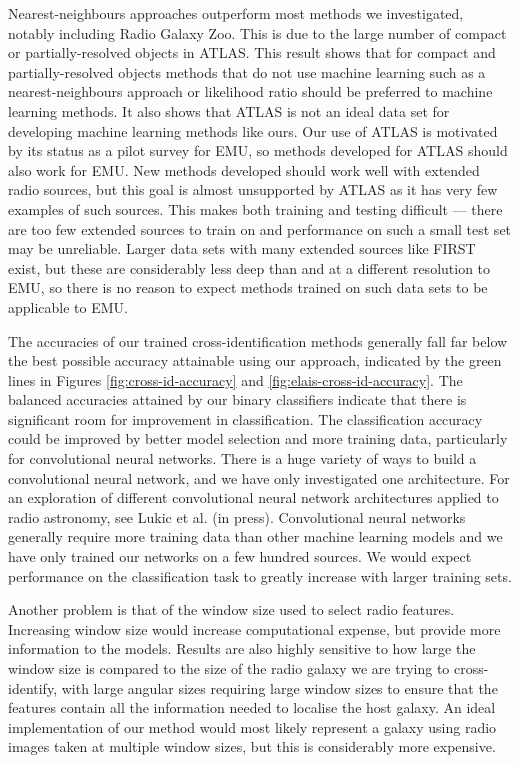 \documentclass[fleqn,usenatbib,usedcolumn]{mnras}
\begin{document}
  Nearest-neighbours approaches outperform most methods we investigated,
  notably including Radio Galaxy Zoo. This is due to the large number of
  compact or partially-resolved objects in ATLAS. This result shows that for
  compact and partially-resolved objects methods that do not use machine
  learning such as a nearest-neighbours approach or likelihood ratio
  \citep{weston18lrpy} should be preferred to machine learning methods. It
  also shows that ATLAS is not an ideal data set for developing machine
  learning methods like ours. Our use of ATLAS is motivated by its status as a
  pilot survey for EMU, so methods developed for ATLAS should also work for
  EMU. New methods developed should work well with extended radio sources, but
  this goal is almost unsupported by ATLAS as it has very few examples of such
  sources. This makes both training and testing difficult --- there are too
  few extended sources to train on and performance on such a small test set
  may be unreliable. Larger data sets with many extended sources like FIRST
  exist, but these are considerably less deep than and at a different
  resolution to EMU, so there is no reason to expect methods trained on such
  data sets to be applicable to EMU.

  The accuracies of our trained cross-identification methods generally fall
  far below the best possible accuracy attainable using our approach,
  indicated by the green lines in Figures \ref{fig:cross-id-accuracy} and
  \ref{fig:elais-cross-id-accuracy}. The balanced accuracies attained by our
  binary classifiers indicate that there is significant room for improvement
  in classification. The classification accuracy could be improved by better
  model selection and more training data, particularly for convolutional
  neural networks. There is a huge variety of ways to build a convolutional
  neural network, and we have only investigated one architecture. For an
  exploration of different convolutional neural network architectures applied
  to radio astronomy, see Lukic et al. (in press). Convolutional neural
  networks generally require more training data than other machine learning
  models and we have only trained our networks on a few hundred sources. We
  would expect performance on the classification task to greatly increase
  with larger training sets.

  Another problem is that of the window size used to select radio features.
  Increasing window size would increase computational expense, but provide
  more information to the models. Results are also highly sensitive to how
  large the window size is compared to the size of the radio galaxy we are
  trying to cross-identify, with large angular sizes requiring large window
  sizes to ensure that the features contain all the information needed to
  localise the host galaxy. An ideal implementation of our method would most
  likely represent a galaxy using radio images taken at multiple window
  sizes, but this is considerably more expensive.
\end{document}
